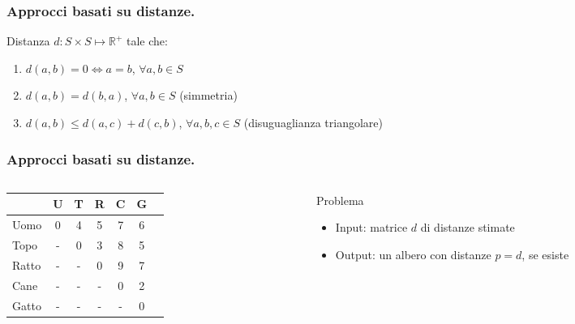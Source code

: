 \begin{frame}[fragile]
	\frametitle{Approcci basati su distanze.}
	\begin{block}{Distanza}
		$d: S \times S \mapsto \mathbb{R}^{+}$ tale che:
		\begin{enumerate}
			\item
			      $d(a,b) = 0 \Leftrightarrow a=b$, $\forall a,b\in S$
			\item
			      $d(a,b) = d(b,a)$, $\forall a,b\in S$ (simmetria)
			\item
			      $d(a,b) \le d(a,c) + d(c,b)$, $\forall a,b,c\in S$ (disuguaglianza triangolare)
		\end{enumerate}
	\end{block}
\end{frame}



\begin{frame}
	\frametitle{Approcci basati su distanze.}
	\begin{columns}
		\begin{column}{0.48\textwidth}
			{
				\begin{tabular}{l|cccccc}
					      & U & T & R & C & G \\ \hline
					Uomo  & 0 & 4 & 5 & 7 & 6 \\
					Topo  & - & 0 & 3 & 8 & 5 \\
					Ratto & - & - & 0 & 9 & 7 \\
					Cane  & - & - & - & 0 & 2 \\
					Gatto & - & - & - & - & 0
				\end{tabular}
			}
		\end{column}
		\begin{column}{0.48\textwidth}
			\begin{block}{Problema}
				\begin{itemize}
					\item
					      Input: matrice $d$ di distanze stimate
					\item
					      Output: un albero con distanze $p = d$, se esiste
				\end{itemize}
			\end{block}
		\end{column}
	\end{columns}
\end{frame}


